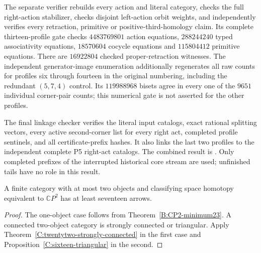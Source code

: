 \begin{remark}
\label{C:sixteen-triangular-verification}
The separate verifier 
rebuilds every action and literal category, checks the full
right-action stabilizer, checks disjoint left-action orbit
weights, and independently verifies every retraction, primitive
or positive-third-homology claim.  Its complete thirteen-profile
gate checks $4483769801$ action equations,
$288244240$ typed associativity equations,
$18570604$ cocycle equations and $115804412$ primitive equations.
There are $16922804$ checked proper-retraction witnesses.
The independent generator-image enumeration
 additionally regenerates
all raw counts for profiles six through fourteen in the original
numbering, including the redundant $(5,7,4)$ control.  Its
$119988968$ bisets agree in every one of the $9651$ individual
corner-pair counts; this numerical gate is not asserted for the
other profiles.

The final linkage checker
 verifies the
literal input catalogs, exact rational splitting vectors,
every active second-corner list for every right act, completed
profile sentinels, and all certificate-prefix hashes.  It also
links the last two profiles to the independent complete P5
right-act catalogs.  The combined result is
.
Only completed prefixes of the interrupted historical core stream
are used; unfinished tails have no role in this result.
\end{remark}

\begin{corollary}\label{C:sixteen-two-objects}
A finite category with at most two objects and classifying space
homotopy equivalent to $\mathbb CP^2$ has at least seventeen arrows.
\end{corollary}
\begin{proof}
The one-object case follows from
Theorem~\ref{B:CP2-minimum23}.  A connected two-object category
is strongly connected or triangular.  Apply
Theorem~\ref{C:twentytwo-strongly-connected} in the first case
and Proposition~\ref{C:sixteen-triangular} in the second.
\end{proof}
